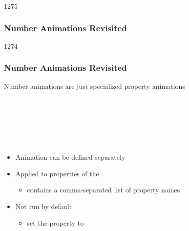 
\begin{slide}{1275}\frametitle{Number Animations Revisited}



\end{slide}


\begin{slide}{1274}\frametitle{Number Animations Revisited}

Number animations are just specialized property animations

\vspace*{0.5em}
\begin{qml}
\\
\\
\\
\\
\\
\qtt{\}}
\end{qml}

\vspace*{0.5em}
\begin{itemize}
\item Animation can be defined separately
\item Applied to properties of the 
  \begin{itemize}
  \item {} contains a comma-separated list of property names
  \end{itemize}
\item Not run by default
  \begin{itemize}
  \item set the  property to 
  \end{itemize}
\end{itemize}

\end{slide}

